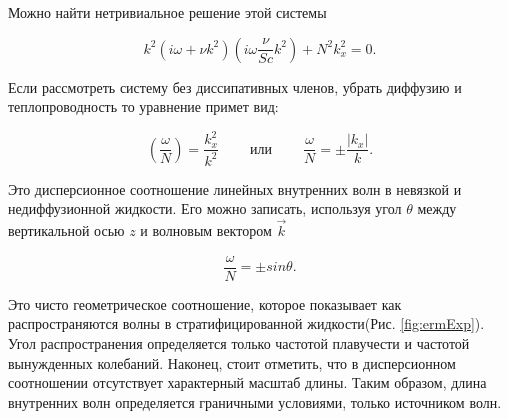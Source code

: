 Можно найти нетривиальное решение этой системы

\begin{equation}
    k^2 \left( i\omega + \nu k^2 \right) \left(i \omega \frac{\nu}{Sc} k^2 \right) + N^2 k^2_x = 0.
\end{equation}

Если рассмотреть систему без диссипативных членов, убрать диффузию и теплопроводность то уравнение примет вид:

\begin{equation}
    \left(\frac{\omega}{N}\right)=\frac{k^2_x}{k^2} \;\;\;\;\;\;\;\; или \;\;\;\;\;\;\;\; \frac{\omega}{N}=\pm \frac{|k_x|}{k}.
\end{equation}

Это дисперсионное соотношение линейных внутренних волн в невязкой и недиффузионной жидкости. Его можно записать, используя угол $\theta$ между вертикальной осью $z$ и волновым вектором $\vec{k}$

\begin{equation}
    \frac{\omega}{N} = \pm sin \theta.
    \label{eq:dispersion}
\end{equation}

Это чисто геометрическое соотношение, которое показывает как распространяются волны в стратифицированной жидкости(Рис. \ref{fig:ermExp}). Угол распространения определяется только частотой плавучести и частотой вынужденных колебаний. Наконец, стоит отметить, что в дисперсионном соотношении отсутствует характерный масштаб длины. Таким образом, длина внутренних волн определяется граничными условиями, только источником волн.

